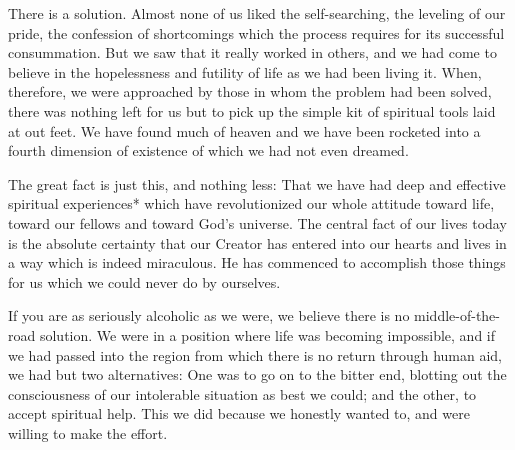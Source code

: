 \begin{biblechapter}

There is a solution. 
Almost none of us liked the self-searching, 
the leveling of our pride, the confession of shortcomings 
which the process requires for its successful consummation. 
But we saw that it really worked in others, 
and we had come to believe in the hopelessness and futility of life as we had been living it. 
When, therefore, we were approached by those in whom the problem had been solved, 
there was nothing left for us but to pick up the simple kit of spiritual tools laid at out feet. 
We have found much of heaven 
and we have been rocketed into a fourth dimension of existence of which we had not even dreamed.

The great fact is just this, and nothing less: 
That we have had deep and effective spiritual experiences* 
which have revolutionized our whole attitude toward life, 
toward our fellows 
and toward God's universe. 
The central fact of our lives today is the absolute certainty that our Creator has entered into our hearts and lives 
in a way which is indeed miraculous. 
He has commenced to accomplish those things for us which we could never do by ourselves.

If you are as seriously alcoholic as we were, we believe there is no middle-of-the-road solution. 
We were in a position where life was becoming impossible, 
and if we had passed into the region from which there is no return through human aid, we had but two alternatives: 
One was to go on to the bitter end, blotting out the consciousness of our intolerable situation as best we could; 
and the other, to accept spiritual help. 
This we did because we honestly wanted to, and were willing to make the effort.
\end{biblechapter}


